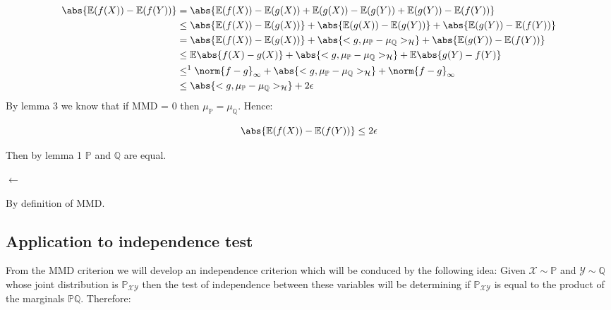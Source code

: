 \begin{equation}{}
\begin{split}
\abs{\mathbb{E}(f(X)) - \mathbb{E}(f(Y))}  
& = \abs{\mathbb{E}(f(X)) - \mathbb{E}(g(X)) + \mathbb{E}(g(X)) - \mathbb{E}(g(Y)) +\mathbb{E}(g(Y)) - \mathbb{E}(f(Y))} \\
&\leq \abs{\mathbb{E}(f(X)) - \mathbb{E}(g(X))} + \abs{\mathbb{E}(g(X)) - \mathbb{E}(g(Y))} +\abs{\mathbb{E}(g(Y)) - \mathbb{E}(f(Y))}\\
&= \abs{\mathbb{E}(f(X)) - \mathbb{E}(g(X))} + \abs{<g,\mu_{\mathbb{P}}-\mu_{\mathbb{Q}}>_{\mathcal{H}} } +\abs{\mathbb{E}(g(Y)) - \mathbb{E}(f(Y))} \\
&\leq \mathbb{E}\abs{f(X) - g(X)} + \abs{<g,\mu_{\mathbb{P}}-\mu_{\mathbb{Q}}>_{\mathcal{H}} } +\mathbb{E}\abs{g(Y) - f(Y)} \\ 
&\leq^{1} \norm{f-g}_{\infty}  + \abs{<g,\mu_{\mathbb{P}}-\mu_{\mathbb{Q}}>_{\mathcal{H}} } + \norm{f-g}_{\infty}\\
&\leq \abs{<g,\mu_{\mathbb{P}}-\mu_{\mathbb{Q}}>_{\mathcal{H}} } + 2\epsilon
\end{split}
\end{equation}
By lemma 3 we know that if MMD = 0 then $\mu_{\mathbb{P}} = \mu_{\mathbb{Q}}$. Hence:

$$\abs{\mathbb{E}(f(X)) - \mathbb{E}(f(Y))} \leq 2\epsilon$$

Then by lemma 1 $\mathbb{P}$ and $\mathbb{Q}$  are equal.

\begin{flushleft}
$\leftarrow$
\end{flushleft}
By definition of MMD.

\subsection{Application to independence test}

From the MMD criterion we will develop an independence criterion which will be conduced by the following idea:
Given $\mathcal{X} \sim \mathbb{P}$ and $\mathcal{Y} \sim \mathbb{Q}$ whose joint distribution is $\mathbb{P}_{\mathcal{XY}}$ then the test of independence between these variables will be determining if $\mathbb{P}_{\mathcal{XY}}$ is equal to the product of the marginals $\mathbb{P}\mathbb{Q}$. Therefore:

